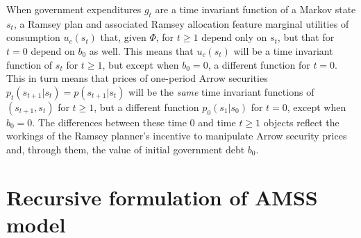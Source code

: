 When  government expenditures  $g_t$ are  a time invariant function of a Markov state $s_t$, a Ramsey plan and associated Ramsey allocation
feature marginal utilities of consumption  $u_c(s_t)$
that, given $\Phi$, for $t \geq 1$  depend only on $s_t$, but that for $t=0$ depend on $b_0$ as well.  This means that $u_c(s_t)$ will be a time invariant
function of $s_t$ for $ t\geq 1$, but except when $b_0 = 0$, a different function for $t=0$.  This in turn means that prices of one-period Arrow securities
$p_t(s_{t+1} | s_t) = p(s_{t+1}|s_t)$ will be the {\it same\/} time invariant functions of $(s_{t+1}, s_t)$ for $t \geq 1$, but a different function $p_0(s_1|s_0)$
for $t=0$, except when $b_0=0$.  The differences between these time $0$ and time $t \geq 1$ objects reflect the workings of the Ramsey planner's incentive
to manipulate Arrow security prices and, through them, the value of initial government debt $b_0$.

%
%




\section{Recursive formulation of AMSS model}

